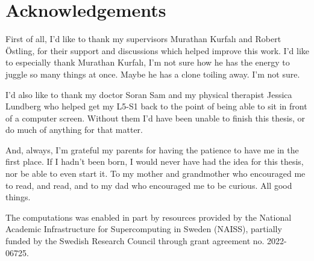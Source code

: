 \chapter*{Acknowledgements}

First of all, I'd like to thank my supervisors Murathan Kurfal\i{} and Robert Östling, for their support and discussions which helped improve this work. I'd like to especially thank Murathan Kurfal\i{}, I'm not sure how he has the energy to juggle so many things at once. Maybe he has a clone toiling away. I'm not sure.

I'd also like to thank my doctor Soran Sam and my physical therapist Jessica Lundberg who helped get my L5-S1 back to the point of being able to sit in front of a computer screen. Without them I'd have been unable to finish this thesis, or do much of anything for that matter.

And, always, I'm grateful my parents for having the patience to have me in the first place. If I hadn't been born, I would never have had the idea for this thesis, nor be able to even start it. To my mother and grandmother who encouraged me to read, and read, and to my dad who encouraged me to be curious. All good things.

\bigskip
\noindent
The computations was enabled in part by resources provided by the National Academic Infrastructure for Supercomputing in Sweden (NAISS), partially funded by the Swedish Research Council through grant agreement no. 2022-06725.
